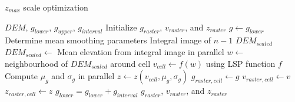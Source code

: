 \documentclass[12pt]{article}
\begin{document}
	\begin{algorithm}
		\caption{$z_{max}$ scale optimization}
		\label{alg:zmax}
		\begin{algorithmic}
			\Require $DEM$, $g_{lower}$, $g_{upper}$, $g_{interval}$
			\State Initialize $g_{raster}$, $v_{raster}$, and $z_{raster}$
			\State $g \gets g_{lower}$
			\State Determine mean smoothing parameters
			\State Integral image of $n-1$ $DEM_{scaled}$
			\State $DEM_{scaled} \gets$ Mean elevation from integral image
			\EndFor
			 in parallel
			\State $w \gets$ neighbourhood of $DEM_{scaled}$ around cell
			\State $v_{cell} \gets f(w)$ using LSP function $f$
			\EndFor
			\State Compute $\mu_g$ and $\sigma_g$
			 in parallel
			\State $z \gets z(v_{cell},\mu_g,\sigma_g)$
			\State $g_{raster,cell} \gets g$
			\State $v_{raster,cell} \gets v$
			\State $z_{raster,cell} \gets z$
			\EndIf
			\EndFor
			\State $g_{lower} = g_{lower} + g_{interval}$
			\EndWhile
			\State \Return $g_{raster}$, $v_{raster}$, and $z_{raster}$
		\end{algorithmic}
	\end{algorithm}
\end{document}
